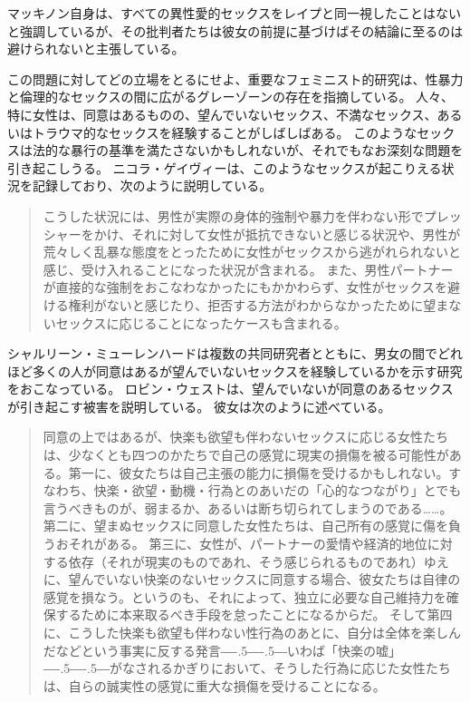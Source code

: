 \documentclass[paper=a4,book,openany]{jlreq}
\newcommand{\ig}[1]{}           %
\def\DDASH{―\kern-.5\zw―\kern-.5\zw―} %
\begin{document}
マッキノン自身は、すべての異性愛的セックスをレイプと同一視したことはないと強調しているが、その批判者たちは彼女の前提に基づけばその結論に至るのは避けられないと主張している。

この問題に対してどの立場をとるにせよ、重要なフェミニスト的研究は、性暴力と倫理的なセックスの間に広がるグレーゾーンの存在を指摘している。
人々、特に女性は、同意はあるものの、望んでいないセックス、不満なセックス、あるいはトラウマ的なセックスを経験することがしばしばある。
このようなセックスは法的な暴行の基準を満たさないかもしれないが、それでもなお深刻な問題を引き起こしうる。
ニコラ・ゲイヴィー\ig{Nicola Gavey}は、このようなセックスが起こりえる状況を記録しており、次のように説明している。

\begin{quote}
こうした状況には、男性が実際の身体的強制や暴力を伴わない形でプレッシャーをかけ、それに対して女性が抵抗できないと感じる状況や、男性が荒々しく乱暴な態度をとったために女性がセックスから逃がれられないと感じ、受け入れることになった状況が含まれる。
また、男性パートナーが直接的な強制をおこなわなかったにもかかわらず、女性がセックスを避ける権利がないと感じたり、拒否する方法がわからなかったために望まないセックスに応じることになったケースも含まれる。
\citep[p.136]{gavey04:_just_sex}
\end{quote}

シャルリーン・ミューレンハードは複数の共同研究者とともに、男女の間でどれほど多くの人が同意はあるが望んでいないセックスを経験しているかを示す研究をおこなっている\citep[cf.][]{muehlenhard05:_wantin_not_wantin_sex,peterson07:_concep_wanted_women_consen_noncon_sexual_exper}。
ロビン・ウェスト\ig{Robin West}は、望んでいないが同意のあるセックスが引き起こす被害を説明している。
彼女は次のように述べている。

\begin{quote}
同意の上ではあるが、快楽も欲望も伴わないセックスに応じる女性たちは、少なくとも四つのかたちで自己の感覚に現実の損傷を被る可能性がある。第一に、彼女たちは自己主張の能力に損傷を受けるかもしれない。すなわち、快楽・欲望・動機・行為とのあいだの「心的なつながり」とでも言うべきものが、弱まるか、あるいは断ち切られてしまうのである……。第二に、望まぬセックスに同意した女性たちは、自己所有の感覚に傷を負うおそれがある。
第三に、女性が、パートナーの愛情や経済的地位に対する依存（それが現実のものであれ、そう感じられるものであれ）ゆえに、望んでいない快楽のないセックスに同意する場合、彼女たちは自律の感覚を損なう。というのも、それによって、独立に必要な自己維持力を確保するために本来取るべき手段を怠ったことになるからだ。
そして第四に、こうした快楽も欲望も伴わない性行為のあとに、自分は全体を楽しんだなどという事実に反する発言{\DDASH}いわば「快楽の嘘」{\DDASH}がなされるかぎりにおいて、そうした行為に応じた女性たちは、自らの誠実性の感覚に重大な損傷を受けることになる。\citep[p.53]{west95:_harms_of_consen_sex}
\end{quote}
\end{document}
